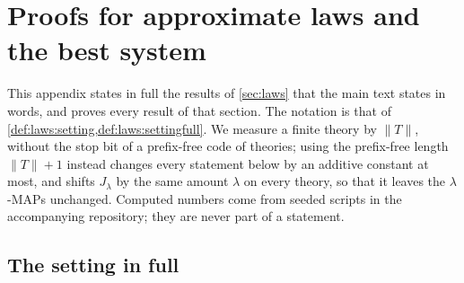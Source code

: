 \section{Proofs for approximate laws and the best system}\label{app:laws}

This appendix states in full the results of \cref{sec:laws} that the main text states in words, and proves every result of that section. The notation is that of \cref{def:laws:setting,def:laws:settingfull}. We measure a finite theory by $\lVert T\rVert$, without the stop bit of a prefix-free code of theories; using the prefix-free length $\lVert T\rVert+1$ instead changes every statement below by an additive constant at most, and shifts $J_\lambda$ by the same amount $\lambda$ on every theory, so that it leaves the $\lambda$-MAPs unchanged. Computed numbers come from seeded scripts in the accompanying repository; they are never part of a statement.

\subsection{The setting in full}\label{app:laws:setting}

